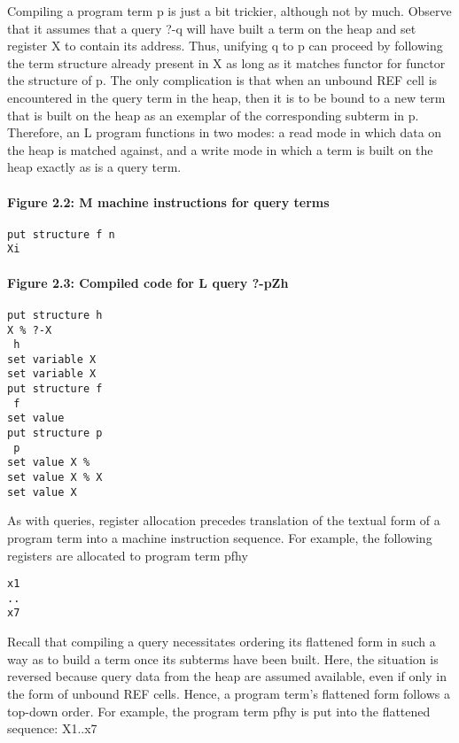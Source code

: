 
Compiling a program term p is just a bit trickier, although not by much. Observe
that it assumes that a query ?-q will have built a term on the heap and set register
X
 to contain its address. Thus, unifying q to p can proceed by following the term
structure already present in X
 as long as it matches functor for functor the structure
of p. The only complication is that when an unbound REF cell is encountered
in the query term in the heap, then it is to be bound to a new term that is built on
the heap as an exemplar of the corresponding subterm in p. Therefore, an L
program
functions in two modes: a read mode in which data on the heap is matched
against, and a write mode in which a term is built on the heap exactly as is a
query term.

\paragraph{Figure 2.2: M machine instructions for query terms}
\begin{verbatim}
put structure f n
Xi
\end{verbatim}

\paragraph{Figure 2.3: Compiled code for L query ?-pZh}
\begin{verbatim}
put structure h
X % ?-X 
 h
set variable X 
set variable X
put structure f
 f
set value 
put structure p
 p
set value X % 
set value X % X
set value X
\end{verbatim}

As with queries, register allocation precedes translation of the textual form of a
program term into a machine instruction sequence. For example, the following
registers are allocated to program term pfhy
\begin{verbatim}
x1
..
x7
\end{verbatim}


Recall that compiling a query necessitates ordering its flattened form in such a
way as to build a term once its subterms have been built. Here, the situation is
reversed because query data from the heap are assumed available, even if only in
the form of unbound REF cells. Hence, a program term’s flattened form follows
a top-down order. For example, the program term pfhy
is put into the flattened sequence: X1..x7
 
